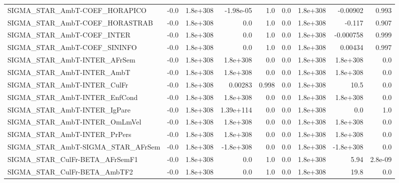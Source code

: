 \begin{tabular}{lrrrrrrrr}
SIGMA\_STAR\_AmbT-COEF\_HORAPICO         &        -0.0 &     1.8e+308 &  -1.98e-05 &      1.0 &        0.0 &    1.8e+308 &     -0.00902 &         0.993 \\
SIGMA\_STAR\_AmbT-COEF\_HORASTRAB        &        -0.0 &     1.8e+308 &        0.0 &      1.0 &        0.0 &    1.8e+308 &       -0.117 &         0.907 \\
SIGMA\_STAR\_AmbT-COEF\_INTER            &        -0.0 &     1.8e+308 &        0.0 &      1.0 &        0.0 &    1.8e+308 &    -0.000758 &         0.999 \\
SIGMA\_STAR\_AmbT-COEF\_SININFO          &        -0.0 &     1.8e+308 &        0.0 &      1.0 &        0.0 &    1.8e+308 &      0.00434 &         0.997 \\
SIGMA\_STAR\_AmbT-INTER\_AFrSem          &        -0.0 &     1.8e+308 &   1.8e+308 &      0.0 &        0.0 &    1.8e+308 &     1.8e+308 &           0.0 \\
SIGMA\_STAR\_AmbT-INTER\_AmbT            &        -0.0 &     1.8e+308 &   1.8e+308 &      0.0 &        0.0 &    1.8e+308 &     1.8e+308 &           0.0 \\
SIGMA\_STAR\_AmbT-INTER\_CulFr           &        -0.0 &     1.8e+308 &    0.00283 &    0.998 &        0.0 &    1.8e+308 &         10.5 &           0.0 \\
SIGMA\_STAR\_AmbT-INTER\_EnfCond         &        -0.0 &     1.8e+308 &   1.8e+308 &      0.0 &        0.0 &    1.8e+308 &     1.8e+308 &           0.0 \\
SIGMA\_STAR\_AmbT-INTER\_IgPare          &        -0.0 &     1.8e+308 &  1.39e+114 &      0.0 &        0.0 &    1.8e+308 &          0.0 &           1.0 \\
SIGMA\_STAR\_AmbT-INTER\_OmLmVel         &        -0.0 &     1.8e+308 &   1.8e+308 &      0.0 &        0.0 &    1.8e+308 &     1.8e+308 &           0.0 \\
SIGMA\_STAR\_AmbT-INTER\_PrPers          &        -0.0 &     1.8e+308 &   1.8e+308 &      0.0 &        0.0 &    1.8e+308 &     1.8e+308 &           0.0 \\
SIGMA\_STAR\_AmbT-SIGMA\_STAR\_AFrSem     &        -0.0 &     1.8e+308 &  -1.8e+308 &      0.0 &        0.0 &    1.8e+308 &    -1.8e+308 &           0.0 \\
SIGMA\_STAR\_CulFr-BETA\_AFrSemF1        &        -0.0 &     1.8e+308 &        0.0 &      1.0 &        0.0 &    1.8e+308 &         5.94 &       2.8e-09 \\
SIGMA\_STAR\_CulFr-BETA\_AmbTF2          &        -0.0 &     1.8e+308 &        0.0 &      1.0 &        0.0 &    1.8e+308 &         19.8 &           0.0 \\

\end{tabular}
